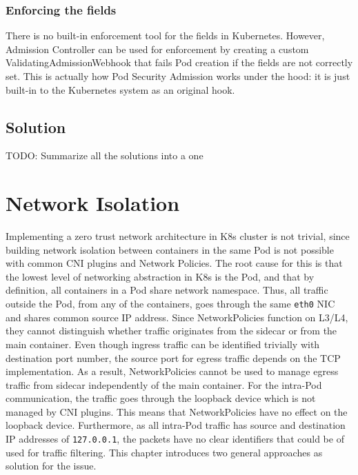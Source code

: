 \documentclass[english, 12pt, a4paper, sci, utf8, a-2b, online]{aaltothesis}
\begin{document}
\subsubsection{Enforcing the fields}

There is no built-in enforcement tool for the fields in Kubernetes. However, Admission Controller can be used for enforcement by creating a custom ValidatingAdmissionWebhook that fails Pod creation if the fields are not correctly set. This is actually how Pod Security Admission works under the hood: it is just built-in to the Kubernetes system as an original hook.


\subsection{Solution}

TODO: Summarize all the solutions into a one

\clearpage

\section{Network Isolation} \label{sec:network-solution}

Implementing a zero trust network architecture in K8s cluster is not trivial, since building network isolation between containers in the same Pod is not possible with common CNI plugins and Network Policies. The root cause for this is that the lowest level of networking abstraction in K8s is the Pod, and that by definition, all containers in a Pod share network namespace. Thus, all traffic outside the Pod, from any of the containers, goes through the same \texttt{eth0} NIC and shares common source IP address. Since NetworkPolicies function on L3/L4, they cannot distinguish whether traffic originates from the sidecar or from the main container. Even though ingress traffic can be identified trivially with destination port number, the source port for egress traffic depends on the TCP implementation. As a result, NetworkPolicies cannot be used to manage egress traffic from sidecar independently of the main container. For the intra-Pod communication, the traffic goes through the loopback device which is not managed by CNI plugins. This means that NetworkPolicies have no effect on the loopback device. Furthermore, as all intra-Pod traffic has source and destination IP addresses of \texttt{127.0.0.1}, the packets have no clear identifiers that could be of used for traffic filtering. This chapter introduces two general approaches as solution for the issue.
\end{document}
